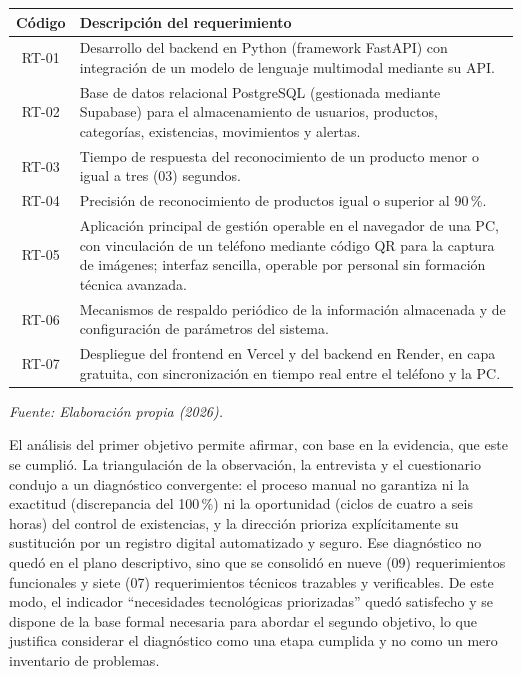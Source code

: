 \documentclass[12pt, letterpaper]{report}
\begin{document}
\begin{center}
\begin{tabular}{|c|>{\raggedright\arraybackslash}p{9.0cm}|}
\hline
\textbf{Código} & \textbf{Descripción del requerimiento} \\
\hline
RT-01 & Desarrollo del backend en Python (framework FastAPI) con
integración de un modelo de lenguaje multimodal mediante su API. \\
\hline
RT-02 & Base de datos relacional PostgreSQL (gestionada mediante
Supabase) para el almacenamiento de usuarios, productos, categorías,
existencias, movimientos y alertas. \\
\hline
RT-03 & Tiempo de respuesta del reconocimiento de un producto menor o
igual a tres (03) segundos. \\
\hline
RT-04 & Precisión de reconocimiento de productos igual o superior al
90\,\%. \\
\hline
RT-05 & Aplicación principal de gestión operable en el navegador de
una PC, con vinculación de un teléfono mediante código QR para la
captura de imágenes; interfaz sencilla, operable por personal sin
formación técnica avanzada. \\
\hline
RT-06 & Mecanismos de respaldo periódico de la información almacenada
y de configuración de parámetros del sistema. \\
\hline
RT-07 & Despliegue del frontend en Vercel y del backend en Render, en
capa gratuita, con sincronización en tiempo real entre el teléfono y
la PC. \\
\hline
\end{tabular}
\end{center}
\vspace{2pt}
\noindent\small\textit{Fuente: Elaboración propia (2026).}\normalsize
{}

\vspace{6pt}

El análisis del primer objetivo permite afirmar, con base en la
evidencia, que este se cumplió. La triangulación de la observación, la
entrevista y el cuestionario condujo a un diagnóstico convergente: el
proceso manual no garantiza ni la exactitud (discrepancia del 100\,\%)
ni la oportunidad (ciclos de cuatro a seis horas) del control de
existencias, y la dirección prioriza explícitamente su sustitución por
un registro digital automatizado y seguro. Ese diagnóstico no quedó en
el plano descriptivo, sino que se consolidó en nueve (09)
requerimientos funcionales y siete (07) requerimientos técnicos
trazables y verificables. De este modo, el indicador ``necesidades
tecnológicas priorizadas'' quedó satisfecho y se dispone de la base
formal necesaria para abordar el segundo objetivo, lo que justifica
considerar el diagnóstico como una etapa cumplida y no como un mero
inventario de problemas.
\end{document}
